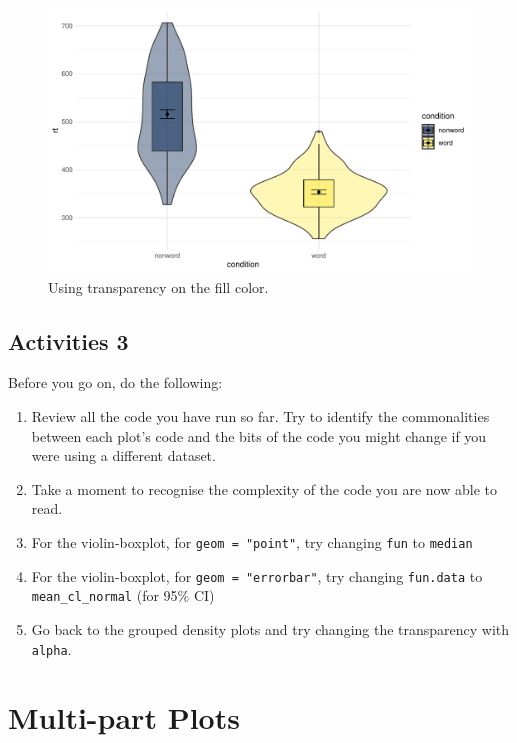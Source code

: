 \documentclass[
  english,
  doc,floatsintext]{apa6}
\begin{document}
\begin{figure}

{\centering \includegraphics[width=1\linewidth]{images/viobox6-1} 

}

\caption{Using transparency on the fill color.}\label{fig:viobox6}
\end{figure}

\hypertarget{activities-3}{%
\subsection{Activities 3}\label{activities-3}}

Before you go on, do the following:

\begin{enumerate}
\def\labelenumi{\arabic{enumi}.}
\item
  Review all the code you have run so far. Try to identify the commonalities between each plot's code and the bits of the code you might change if you were using a different dataset.
\item
  Take a moment to recognise the complexity of the code you are now able to read.
\item
  For the violin-boxplot, for \texttt{geom\ =\ "point"}, try changing \texttt{fun} to \texttt{median}
\item
  For the violin-boxplot, for \texttt{geom\ =\ "errorbar"}, try changing \texttt{fun.data} to \texttt{mean\_cl\_normal} (for 95\% CI)
\item
  Go back to the grouped density plots and try changing the transparency with \texttt{alpha}.
\end{enumerate}

\hypertarget{multi-part-plots}{%
\section{Multi-part Plots}\label{multi-part-plots}}
\end{document}
